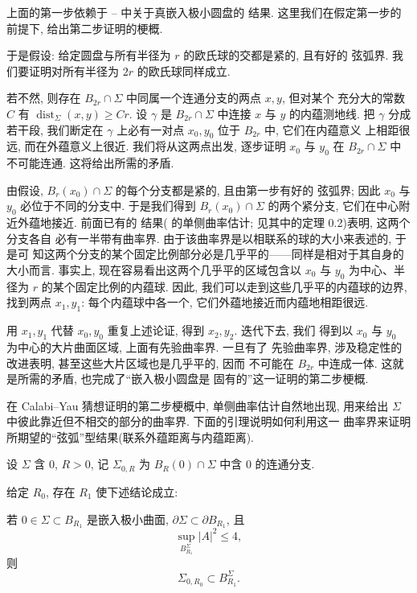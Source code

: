上面的第一步依赖于 \cite{CM3}--\cite{CM6} 中关于真嵌入极小圆盘的
结果. 这里我们在假定第一步的前提下, 给出第二步证明的梗概.

于是假设: 给定圆盘与所有半径为 $r$ 的欧氏球的交都是紧的, 且有好的
弦弧界. 我们要证明对所有半径为 $2r$ 的欧氏球同样成立.

若不然, 则存在 $B_{2r}\cap\Sigma$ 中同属一个连通分支的两点 $x,y$, 但对某个
充分大的常数 $C$ 有 $\operatorname{dist}_\Sigma(x,y)\geq Cr$. 设 $\gamma$ 是
$B_{2r}\cap\Sigma$ 中连接 $x$ 与 $y$ 的内蕴测地线. 把 $\gamma$ 分成若干段,
我们断定在 $\gamma$ 上必有一对点 $x_0,y_0$ 位于 $B_{2r}$ 中, 它们在内蕴意义
上相距很远, 而在外蕴意义上很近. 我们将从这两点出发, 逐步证明 $x_0$ 与
$y_0$ 在 $B_{2r}\cap\Sigma$ 中不可能连通. 这将给出所需的矛盾.

由假设, $B_r(x_0)\cap\Sigma$ 的每个分支都是紧的, 且由第一步有好的
弦弧界; 因此 $x_0$ 与 $y_0$ 必位于不同的分支中. 于是我们得到
$B_r(x_0)\cap\Sigma$ 的两个紧分支, 它们在中心附近外蕴地接近. 前面已有的
结果(\cite{CM6} 的单侧曲率估计; 见其中的定理 0.2)表明, 这两个分支各自
必有一半带有曲率界. 由于该曲率界是以相联系的球的大小来表述的, 于是可
知这两个分支的某个固定比例部分必是几乎平的——同样是相对于其自身的大小而言.
事实上, 现在容易看出这两个几乎平的区域包含以 $x_0$ 与 $y_0$ 为中心、半径为
$r$ 的某个固定比例的内蕴球. 因此, 我们可以走到这些几乎平的内蕴球的边界,
找到两点 $x_1,y_1$: 每个内蕴球中各一个, 它们外蕴地接近而内蕴地相距很远.

用 $x_1,y_1$ 代替 $x_0,y_0$ 重复上述论证, 得到 $x_2,y_2$. 迭代下去, 我们
得到以 $x_0$ 与 $y_0$ 为中心的大片曲面区域, 上面有先验曲率界. 一旦有了
先验曲率界, 涉及稳定性的改进表明, 甚至这些大片区域也是几乎平的, 因而
不可能在 $B_{2r}$ 中连成一体. 这就是所需的矛盾, 也完成了``嵌入极小圆盘是
固有的''这一证明的第二步梗概.

在 Calabi--Yau 猜想证明的第二步梗概中, 单侧曲率估计自然地出现, 用来给出
$\Sigma$ 中彼此靠近但不相交的部分的曲率界. 下面的引理说明如何利用这一
曲率界来证明所期望的``弦弧''型结果(联系外蕴距离与内蕴距离).

设 $\Sigma$ 含 $0$, $R>0$, 记 $\Sigma_{0,R}$ 为 $B_R(0)\cap\Sigma$ 中含 $0$
的连通分支.

\begin{lemma}
\label{lem:8.23}
给定 $R_0$, 存在 $R_1$ 使下述结论成立:

若 $0\in\Sigma\subset B_{R_1}$ 是嵌入极小曲面, $\partial\Sigma\subset
\partial B_{R_1}$, 且
\begin{equation}
\sup_{B_{R_1}^\Sigma}|A|^2\leq4,
\label{eq:8.86}
\end{equation}
则
\begin{equation}
\Sigma_{0,R_0}\subset B_{R_1}^\Sigma.
\label{eq:8.87}
\end{equation}
\end{lemma}

